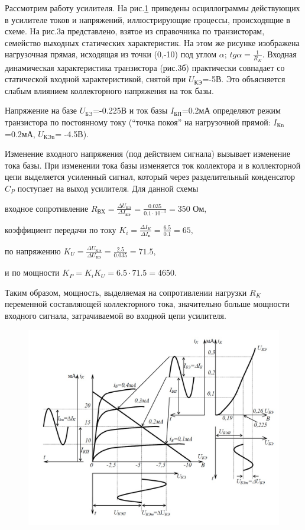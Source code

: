 Рассмотрим работу усилителя. На рис.\ref{fig:3} приведены осциллограммы действующих в усилителе токов и напряжений, иллюстрирующие процессы, происходящие в схеме. На рис.3а представлено, взятое из справочника по транзисторам, семейство выходных статических характеристик. На этом же рисунке изображена нагрузочная прямая, исходящая из точки (0,-10) под углом $\alpha$; $tg\alpha = \frac{1}{R_K}$. Входная динамическая характеристика транзистора (рис.3б) практически совпадает со статической входной характеристикой, снятой при $U_{\text{КЭ}}$=-5В. Это объясняется слабым влиянием коллекторного напряжения на ток базы.

Напряжение на базе $U_{\text{БЭ}}$=-0.225В и ток базы $I_{\text{БП}}$=0.2мА
определяют режим транзистора по постоянному току (“точка покоя” на нагрузочной прямой: $I_{\text{Кn}}$=0.2мА, $U_{\text{КЭn}}$= -4.5В).

Изменение входного напряжения (под действием сигнала) вызывает изменение тока базы. При изменении тока базы изменяется ток коллектора и в коллекторной цепи выделяется
усиленный сигнал, который через разделительный конденсатор $C_P$ поступает на выход усилителя. Для данной схемы

входное сопротивление $R_{\text{ВХ}}=\frac{\Delta U_{\text{БЭ}}}{\Delta I_{\text{БЭ}}}=\frac{0.035}{0.1\cdot10^{-3}}=350 \text{ Ом},$

коэффициент передачи по току $K_i=\frac{\Delta I_K}{\Delta I_{\text{Б}}}=\frac{6.5}{0.1}=65,$

по напряжению $K_U=\frac{\Delta U_{\text{KЭ}}}{\Delta U_{\text{БЭ}}}=\frac{2.5}{0.035}=71.5,$

и по мощности $K_P=K_i K_U=6.5\cdot 71.5=4650.$

Таким образом, мощность, выделяемая на сопротивлении нагрузки $R_K$ переменной составляющей коллекторного тока, значительно больше мощности входного сигнала, затрачиваемой во входной цепи усилителя.

\begin{figure}[h]
	\centering
	\includegraphics[width=\linewidth]{fig/fig3}
	\caption{}
	\label{fig:3}
\end{figure}


